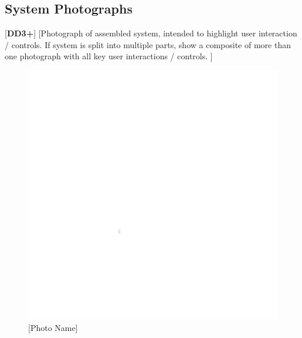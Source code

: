 \subsection{System Photographs} %
[\textbf{DD3+}]
[Photograph of assembled system, intended to highlight user interaction / controls. If system is split into multiple parts, show a composite of more than one photograph with all key user interactions / controls. ]
\begin{figure}[h]
    \centering
    \includegraphics[width=16cm]{images/white.png} %
    \caption{[Photo Name]}
\end{figure}
